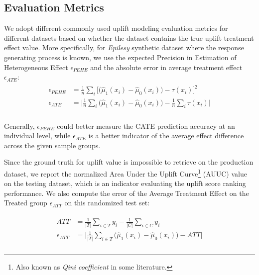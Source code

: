 \documentclass[sigconf]{acmart}
\begin{document}
\subsection{Evaluation Metrics}
We adopt different commonly used uplift modeling evaluation metrics for different datasets based on whether the dataset contains the true uplift treatment effect value. More specifically, for \textit{Epilesy} synthetic dataset where the response generating process is known, we use the expected Precision in Estimation of Heterogeneous Effect $\epsilon_{PEHE}$ \cite{Schwab2019b, Shalit2017} and the absolute error in average treatment effect $\epsilon_{ATE}$:
\begin{align}
    \label{Pehe Ate}
    \begin{aligned}
    \epsilon_{PEHE} &= \frac{1}{n}\sum_{i} \big[\big(\hat\mu_1(x_i) - \hat\mu_0(x_i)\big)- \tau(x_i)\big]^{2} \\
    \epsilon_{ATE} &= \big|  \frac{1}{n}\sum_i \big(\hat\mu_1(x_i) - \hat\mu_0(x_i)\big) -  \frac{1}{n}\sum_i\tau(x_i) \big| \\
    \end{aligned}
\end{align}

Generally, $\epsilon_{PEHE}$ could better measure the CATE prediction accuracy at an individual level, while $\epsilon_{ATE}$ is a better indicator of the average effect difference across the given sample groups.

Since the ground truth for uplift value is impossible to retrieve on the production dataset, we report the normalized Area Under the Uplift Curve\footnote{Also known as \textit{Qini coefficient} in some literature.} (AUUC) \cite{Soltys2015-be, Zhao2017-kg, Rzepakowski2012-br, Gutierrez2016-co} value on the testing dataset, which is an indicator evaluating the uplift score ranking performance. We also compute the error of the Average Treatment Effect on the Treated group $\epsilon_{ATT}$ on this randomized test set:

\begin{align}
    \label{Att}
    \begin{aligned}
     ATT &= \frac{1}{|T|}\sum_{i\in T}{y_{i}} - \frac{1}{|C|}\sum_{i \in C}{y_{i}} \\ 
    \epsilon_{ATT} &= \big|\frac{1}{|T|} \sum_{i \in{T}} \big(\hat\mu_1(x_i) - \hat\mu_0(x_i)\big) - ATT\big| \\ 
    \end{aligned}
\end{align}
\end{document}
